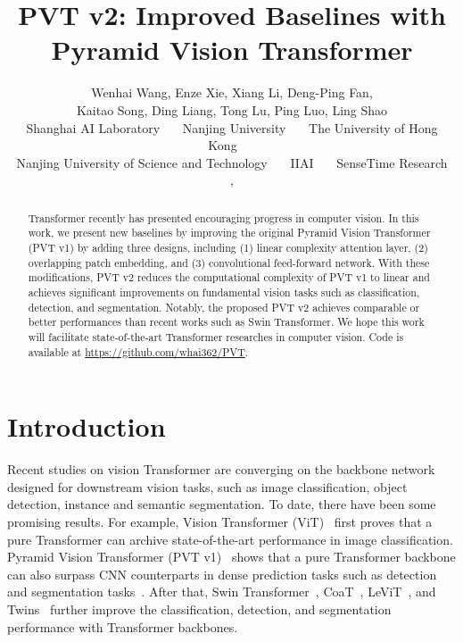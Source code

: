 \documentclass[10pt,twocolumn,letterpaper]{article}
\begin{document}
	
	\title{PVT v2: Improved Baselines with Pyramid Vision Transformer}
	
	\author{
		Wenhai Wang, 
		Enze Xie,
		Xiang Li,
		Deng-Ping Fan,\\
		Kaitao Song,
		Ding Liang,
		Tong Lu,
		Ping Luo,
		Ling Shao\\
		Shanghai AI Laboratory~~~
		Nanjing University~~~
		The University of Hong Kong~~~\\
		Nanjing University of Science and Technology~~~
		IIAI~~~
		SenseTime Research\\
		,
	}
	
	\maketitle
	\ificcvfinal\thispagestyle{empty}\fi
	
	
	
\begin{abstract}
		Transformer recently has presented encouraging progress in computer vision. 
		In this work, we present new baselines by improving the original Pyramid Vision Transformer (PVT v1) by adding three designs, including 
		(1) linear complexity attention layer, (2) overlapping patch embedding, and (3) convolutional feed-forward network.
		With these modifications, PVT v2 reduces the computational complexity of PVT v1 to linear and achieves significant improvements on fundamental vision tasks such as classification, detection, and segmentation.
		Notably, the proposed PVT v2 achieves comparable or better performances than recent works such as Swin Transformer.
		We hope this work will facilitate state-of-the-art  Transformer researches in computer vision. Code is available at {\url{https://github.com/whai362/PVT}}.
	\end{abstract}
	
	
	\section{Introduction}\label{sec:introduction}
	
	Recent studies on vision Transformer are converging on the backbone network~\cite{dosovitskiy2020image,touvron2020training,pvt,cvt,swin,coat,levit,twins} designed for downstream vision tasks, such as image classification, object detection, instance and semantic segmentation.
To date, there have been some promising results. 
	For example, Vision Transformer (ViT)~\cite{dosovitskiy2020image} first proves that a pure Transformer can archive state-of-the-art performance in image classification.
Pyramid Vision Transformer (PVT v1)~\cite{pvt} shows that a pure Transformer backbone can also surpass CNN counterparts in dense prediction tasks such as detection and segmentation tasks~\cite{lin2014microsoft,zhou2017scene}.
After that, Swin Transformer~\cite{swin}, CoaT~\cite{coat}, LeViT~\cite{levit}, and Twins~\cite{twins} further improve the classification, detection, and segmentation performance with Transformer backbones.
	
\end{document}
